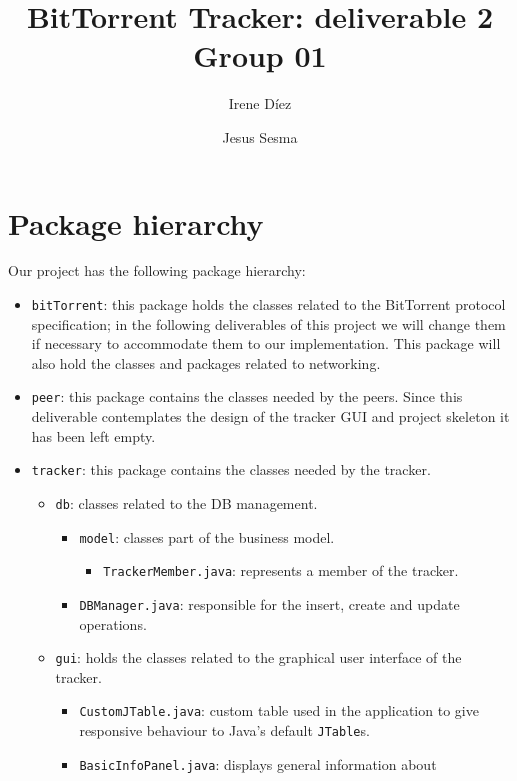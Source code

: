 \documentclass[twoside,a4paper,10pt]{article}
\title{BitTorrent Tracker: deliverable 2\\
  Group 01}
\author{Irene Díez \and Jesus Sesma}
\begin{document}
\date{}
\maketitle

\section{Package hierarchy}\label{sec:pa-hierarchy}

Our project has the following package hierarchy:

\begin{itemize}
\item \texttt{bitTorrent}: this package holds the classes related to the
  BitTorrent protocol specification; in the following deliverables of this
  project we will change them if necessary to accommodate them to our
  implementation.
  This package will also hold the classes and packages related to networking.
\item \texttt{peer}: this package contains the classes needed by the peers. 
  Since this deliverable contemplates the design of the tracker GUI and
  project skeleton it has been left empty.
\item \texttt{tracker}: this package contains the classes needed by the tracker.
  \begin{itemize}
  \item \texttt{db}: classes related to the DB management.
    \begin{itemize}
    \item \texttt{model}: classes part of the business model.
      \begin{itemize}
      \item \texttt{TrackerMember.java}: represents a member of the tracker.
      \end{itemize}
    \item \texttt{DBManager.java}: responsible for the insert, create and
      update operations.
    \end{itemize}
  \item \texttt{gui}: holds the classes related to the graphical user interface
    of the tracker.
    \begin{itemize}
    \item \texttt{CustomJTable.java}: custom table used in the application to
      give responsive behaviour to Java's default \texttt{JTable}s.
    \item \texttt{BasicInfoPanel.java}: displays general information about

\end{itemize}
\end{itemize}
\end{itemize}
\end{document}
